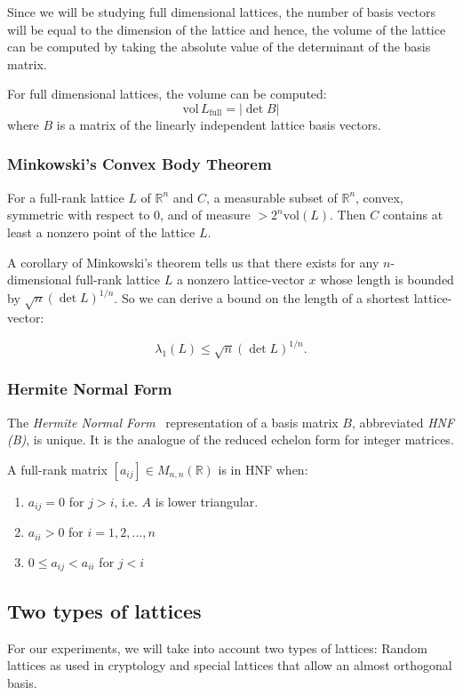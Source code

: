 \documentclass[10pt, a4paper]{article}
\begin{document}
Since we will be studying full dimensional lattices, the number of basis vectors will be equal to the dimension of the lattice and hence, the volume of the lattice can be computed by taking the absolute value of the determinant of the basis matrix.

For full dimensional lattices, the volume can be computed:
\[
\text{vol} \,L_{\text{full}} = |\det B|
\] where $B$ is a matrix of the linearly independent lattice basis vectors.


\subsubsection{Minkowski's Convex Body Theorem}

For a full-rank lattice $L$ of $\mathbb{R}^n$ and $C$, a measurable subset of $\mathbb{R}^n$, convex, symmetric with respect to 0, and of measure $> 2^n \text{vol}(L)$. Then $C$ contains at least a nonzero point of the lattice $L$.

A corollary of Minkowski's theorem tells us that there exists for any $n$-dimensional full-rank lattice $L$ a nonzero lattice-vector $x$ whose length is bounded by $\sqrt{n} (\det L)^{1/n}$. So we can derive a bound on the length of a shortest lattice-vector:

\[
\lambda_1(L) \leq \sqrt{n} (\det L)^{1/n}.
\]

\subsubsection{Hermite Normal Form}

The \emph{Hermite Normal Form}~\cite{SchnorrStanfordNotes} representation of a basis matrix $B$, abbreviated \emph{HNF (B)}, is unique. It is the analogue of the reduced echelon form for integer matrices.

A full-rank matrix $[a_{ij}] \in M_{n,n} (\mathbb{R})$ is in HNF when:
\begin{enumerate}
\item $a_{ij} = 0$ for $j > i$, i.e. $A$ is lower triangular. 
\item $a_{ii} > 0$ for $i=1,2,...,n$
\item $0 \leq a_{ij} < a_{ii}$ for $j < i$
\end{enumerate}

\subsection{Two types of lattices}
For our experiments, we will take into account two types of lattices: Random lattices as used in cryptology and special lattices that allow an almost orthogonal basis.
\end{document}
